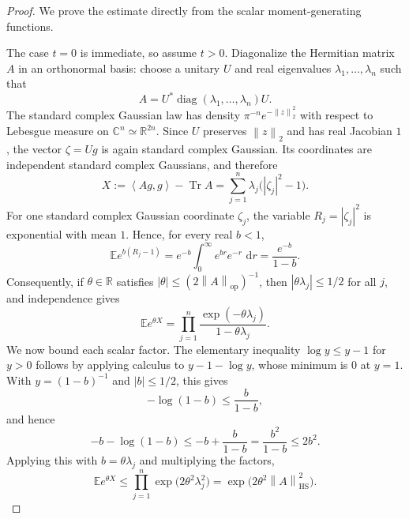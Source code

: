 \documentclass[11pt,oneside]{book}
\DeclareMathOperator{\Tr}{Tr}
\DeclareMathOperator{\diag}{diag}
\newcommand{\C}{\mathbb C}
\newcommand{\R}{\mathbb R}
\newcommand{\E}{\mathbb E}
\newcommand{\1}{\mathbf 1}
\newcommand{\HS}{\mathrm{HS}}
\newcommand{\op}{\mathrm{op}}
\newcommand{\dd}{\,\mathrm d}
\newcommand{\norm}[1]{\left\|#1\right\|}
\newcommand{\ip}[2]{\left\langle #1,#2\right\rangle}
\begin{document}
\begin{proof}
We prove the estimate directly from the scalar moment-generating functions.

The case \(t=0\) is immediate, so assume \(t>0\).  Diagonalize the Hermitian
matrix \(A\) in an orthonormal basis: choose a unitary \(U\) and real
eigenvalues \(\lambda_1,\ldots,\lambda_n\) such that
\[
  A=U^*\diag(\lambda_1,\ldots,\lambda_n)U .
\]
The standard complex Gaussian law has density \(\pi^{-n}e^{-\norm z_2^2}\)
with respect to Lebesgue measure on \(\C^n\simeq\R^{2n}\).  Since \(U\)
preserves \(\norm z_2\) and has real Jacobian \(1\), the vector
\(\zeta=Ug\) is again standard complex Gaussian.  Its coordinates are
independent standard complex Gaussians, and therefore
\[
  X:=\ip{Ag}{g}-\Tr A
   =\sum_{j=1}^n \lambda_j\bigl(|\zeta_j|^2-1\bigr).
\]
For one standard complex Gaussian coordinate \(\zeta_j\), the variable
\(R_j=|\zeta_j|^2\) is exponential with mean \(1\).  Hence, for every
real \(b<1\),
\[
  \E e^{b(R_j-1)}
  = e^{-b}\int_0^\infty e^{br}e^{-r}\,\dd r
  = \frac{e^{-b}}{1-b}.
\]
Consequently, if \(\theta\in\R\) satisfies
\(|\theta|\le(2\norm A_{\op})^{-1}\), then
\(|\theta\lambda_j|\le1/2\) for all \(j\), and independence gives
\[
  \E e^{\theta X}
  =
  \prod_{j=1}^n
  \frac{\exp(-\theta\lambda_j)}{1-\theta\lambda_j}.
\]
We now bound each scalar factor.  The elementary inequality
\(\log y\le y-1\) for \(y>0\) follows by applying calculus to
\(y-1-\log y\), whose minimum is \(0\) at \(y=1\).  With
\(y=(1-b)^{-1}\) and \(|b|\le1/2\), this gives
\[
  -\log(1-b)\le \frac{b}{1-b},
\]
and hence
\[
  -b-\log(1-b)
  \le -b+\frac{b}{1-b}
  =\frac{b^2}{1-b}
  \le 2b^2.
\]
Applying this with \(b=\theta\lambda_j\) and multiplying the factors,
\[
  \E e^{\theta X}
  \le
  \prod_{j=1}^n \exp\bigl(2\theta^2\lambda_j^2\bigr)
  =
  \exp\bigl(2\theta^2\norm A_{\HS}^2\bigr).
\]


\end{proof}
\end{document}
